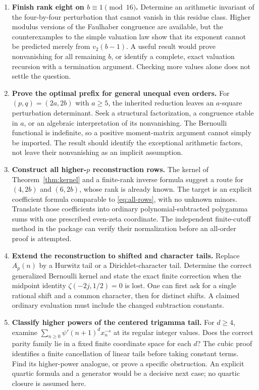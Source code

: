 \begin{enumerate}[leftmargin=*,label=\textbf{Q\arabic*.}]

\item \textbf{Finish rank eight on $b\equiv1\pmod {16}$.}
Determine an arithmetic invariant of the four-by-four perturbation that
cannot vanish in this residue class. Higher modulus versions of the
Faulhaber congruence are available, but the counterexamples to the simple
valuation law show that its exponent cannot be predicted merely from
$v_2(b-1)$. A useful result would prove nonvanishing for all remaining
$b$, or identify a complete, exact valuation recursion with a termination
argument. Checking more values alone does not settle the question.

\item \textbf{Prove the optimal prefix for general unequal even orders.}
For $(p,q)=(2a,2b)$ with $a\ge5$, the inherited reduction leaves an
$a$-square perturbation determinant. Seek a structural factorization,
a congruence stable in $a$, or an algebraic interpretation of its
nonvanishing. The Bernoulli functional is indefinite, so a positive
moment-matrix argument cannot simply be imported. The result should
identify the exceptional arithmetic factors, not leave their nonvanishing
as an implicit assumption.

\item \textbf{Construct all higher-$p$ reconstruction rows.}
The kernel of Theorem~\ref{thm:kernel} and a finite-rank inverse formula
suggest a route for $(4,2b)$ and $(6,2b)$, whose rank is already known.
The target is an explicit coefficient formula comparable to
\eqref{eq:all-rows}, with no unknown minors. Translate those coefficients
into ordinary polynomial-subtracted polygamma sums with one prescribed
even-zeta coordinate. The independent finite-cutoff method in the package
can verify their normalization before an all-order proof is attempted.

\item \textbf{Extend the reconstruction to shifted and character tails.}
Replace $A_p(n)$ by a Hurwitz tail or a Dirichlet-character tail.
Determine the correct generalized Bernoulli kernel and state the exact
finite correction when the midpoint identity
$\zeta(-2j,1/2)=0$ is lost. One can first ask for a single rational
shift and a common character, then for distinct shifts. A claimed
ordinary evaluation must include the changed subtraction constants.

\item \textbf{Classify higher powers of the centered trigamma tail.}
For $d\ge4$, examine
$\sum_{n\ge0}\psi'(n+1)^d x_n^{-s}$ at its regular integer values.
Does the correct parity family lie in a fixed finite coordinate space
for each $d$? The cubic proof identifies a finite cancellation of linear
tails before taking constant terms. Find its higher-power analogue, or
prove a specific obstruction. An explicit quartic formula and a generator
would be a decisive next case; no quartic closure is assumed here.


\end{enumerate}

